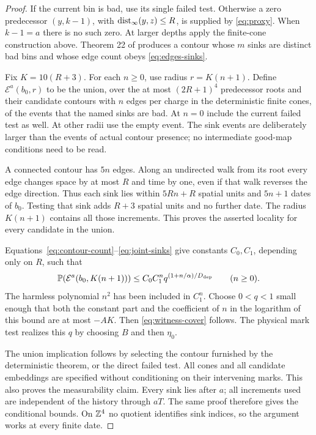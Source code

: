 \begin{proof}
If the current bin is bad, use its single failed test. Otherwise a
zero predecessor \((y,k-1)\), with \(\operatorname{dist}_\infty(y,z)\le R\),
is supplied by \eqref{eq:proxy}. When \(k-1=a\) there is no such
zero. At larger depths apply the finite-cone construction above.
Theorem 22 of \cite{SST} produces a contour whose \(m\) sinks are
distinct bad bins and whose edge count obeys
\eqref{eq:edges-sinks}.

Fix \(K=10(R+3)\). For each \(n\ge0\), use radius
\(r=K(n+1)\). Define \(\mathcal E^a(b_0,r)\) to be the union, over
the at most \((2R+1)^4\) predecessor roots and their candidate
contours with \(n\) edges per charge in the deterministic finite
cones, of the events that the named sinks are bad. At \(n=0\)
include the current failed test as well. At other radii use the
empty event. The sink events are deliberately larger than the
events of actual contour presence; no intermediate good-map
conditions need to be read.

A connected contour has \(5n\) edges. Along an undirected walk from
its root every edge changes space by at most \(R\) and time by one,
even if that walk reverses the edge direction. Thus each sink
lies within \(5Rn+R\) spatial units and \(5n+1\) dates of \(b_0\).
Testing that sink adds \(R+3\) spatial units and no further date.
The radius \(K(n+1)\) contains all those increments. This proves
the asserted locality for every candidate in the union.

Equations~\eqref{eq:contour-count}--\eqref{eq:joint-sinks} give
constants \(C_0,C_1\), depending only on \(R\), such that
\begin{equation}\label{eq:witness-prebound}
 \mathbb P(\mathcal E^a(b_0,K(n+1)))
 \le C_0C_1^n q^{(1+n/\alpha)/D_{\mathrm{dep}}}\qquad(n\ge0).
\end{equation}
The harmless polynomial \(n^2\) has been included in \(C_1^n\).
Choose \(0<q<1\) small enough that both the constant part and the
coefficient of \(n\) in the logarithm of this bound are at most
\(-AK\). Then \eqref{eq:witness-cover} follows. The physical mark
test realizes this \(q\) by choosing \(B\) and then \(\eta_0\).

The union implication follows by selecting the contour furnished
by the deterministic theorem, or the direct failed test. All cones
and all candidate embeddings are specified without conditioning on
their intervening marks. This also proves the measurability claim.
Every sink lies after \(a\); all increments used are independent
of the history through \(aT\). The same proof therefore gives the
conditional bounds. On \(\mathbb Z^4\) no quotient identifies sink indices,
so the argument works at every finite date.
\end{proof}

